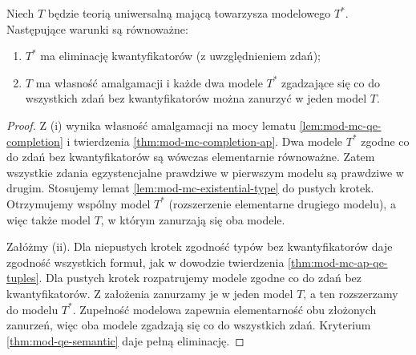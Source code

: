 \begin{twierdzenie}
\label{thm:mod-mc-ap-qe}
Niech $T$ będzie teorią uniwersalną mającą towarzysza
modelowego $T^*$. Następujące warunki są równoważne:
\begin{enumerate}[label=(\roman*)]
\item $T^*$ ma eliminację kwantyfikatorów
(z uwzględnieniem zdań);
\item $T$ ma własność amalgamacji i każde dwa modele
$T^*$ zgadzające się co do wszystkich zdań bez
kwantyfikatorów można zanurzyć w jeden model $T$.
\end{enumerate}
\end{twierdzenie}
\begin{proof}
Z (i) wynika własność amalgamacji na mocy lematu
\ref{lem:mod-mc-qe-completion} i twierdzenia
\ref{thm:mod-mc-completion-ap}.
Dwa modele $T^*$ zgodne co do zdań bez kwantyfikatorów
są wówczas elementarnie równoważne. Zatem wszystkie
zdania egzystencjalne prawdziwe w pierwszym modelu
są prawdziwe w drugim. Stosujemy lemat
\ref{lem:mod-mc-existential-type} do pustych krotek.
Otrzymujemy wspólny model $T^*$ (rozszerzenie
elementarne drugiego modelu), a więc także model $T$,
w którym zanurzają się oba modele.

Załóżmy (ii). Dla niepustych krotek zgodność
typów bez kwantyfikatorów daje zgodność wszystkich
formuł, jak w dowodzie twierdzenia
\ref{thm:mod-mc-ap-qe-tuples}.
Dla pustych krotek rozpatrujemy modele zgodne
co do zdań bez kwantyfikatorów. Z założenia zanurzamy
je w jeden model $T$, a ten rozszerzamy do modelu $T^*$.
Zupełność modelowa zapewnia elementarność
obu złożonych zanurzeń, więc oba modele zgadzają
się co do wszystkich zdań. Kryterium
\ref{thm:mod-qe-semantic} daje pełną eliminację.
\end{proof}

